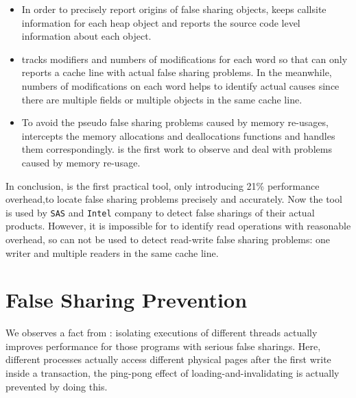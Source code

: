 \begin{itemize}

\item  
In order to precisely report origins of false sharing objects, \SheriffDetect{} keeps callsite 
information for each heap object and reports the source code level information about 
each object. 

\item
\SheriffDetect{} tracks modifiers and numbers of modifications for each word so that 
\SheriffDetect{} can only reports a cache line with actual false sharing problems.  
In the meanwhile, numbers of modifications on each word helps to identify 
actual causes since there are multiple fields or multiple objects 
in the same cache line.  

\item
To avoid the pseudo false sharing problems caused by memory re-usages, 
\SheriffDetect{} intercepts the memory allocations and deallocations functions 
and handles them correspondingly. \SheriffDetect{} is the first work to observe and deal 
with problems caused by memory re-usage.

\end{itemize}  

In conclusion, \SheriffDetect{} is the first practical tool, 
only introducing 21\% performance overhead,to locate false sharing
problems precisely and accurately.
Now the tool is used by \texttt{SAS} and \texttt{Intel} company 
to detect false sharings of their actual products. 
However, it is impossible for \SheriffDetect{}
to identify read operations with reasonable overhead,  
so \SheriffDetect{} can not be used to detect read-write false 
sharing problems: one writer and multiple 
readers in the same cache line.


\section{False Sharing Prevention}

We observes a fact from \SheriffDetect{}: isolating executions of 
different threads actually improves performance for those programs with serious false sharings.
Here, different processes actually access different physical pages after the first 
write inside a transaction, the ping-pong effect of loading-and-invalidating is actually prevented by doing this. 

